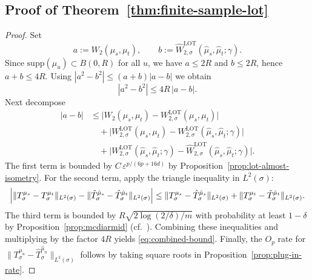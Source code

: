 \documentclass[11pt]{article}
\newcommand{\1}{\mathbf{1}}
\begin{document}
\subsection{Proof of Theorem~\ref{thm:finite-sample-lot}}
\label{app:proof-finite-sample-lot}
\begin{proof}
Set
\[
a:=W_2(\mu_s,\mu_t),\qquad
b:=\widehat{W}_{2,\sigma}^{\mathrm{LOT}}(\hat{\mu}_s,\hat{\mu}_t;\gamma).
\]
Since $\mathrm{supp}(\mu_u)\subset B(0,R)$ for all $u$, we have $a\le 2R$ and
$b\le 2R$, hence $a+b\le 4R$. Using $|a^2-b^2|\le (a+b)|a-b|$ we obtain
\[
|a^2-b^2|\le 4R\,|a-b|.
\]
Next decompose
\begin{align*}
|a-b|
&\le \bigl|W_2(\mu_s,\mu_t) - W_{2,\sigma}^{\mathrm{LOT}}(\mu_s,\mu_t)\bigr|
\\
&\quad + \bigl|W_{2,\sigma}^{\mathrm{LOT}}(\mu_s,\mu_t)
- W_{2,\sigma}^{\mathrm{LOT}}(\hat{\mu}_s,\hat{\mu}_t;\gamma)\bigr|
\\
&\quad + \bigl|W_{2,\sigma}^{\mathrm{LOT}}(\hat{\mu}_s,\hat{\mu}_t;\gamma)
- \widehat{W}_{2,\sigma}^{\mathrm{LOT}}(\hat{\mu}_s,\hat{\mu}_t;\gamma)\bigr|.
\end{align*}
The first term is bounded by $C\,\varepsilon^{p/(6p+16d)}$ by
Proposition~\ref{prop:lot-almost-isometry}.
For the second term, apply the triangle inequality in $L^2(\sigma)$:
\[
\Bigl|\|T_\sigma^{\mu_s}-T_\sigma^{\mu_t}\|_{L^2(\sigma)}
-\|\hat{T}_\sigma^{\hat{\mu}_s}-\hat{T}_\sigma^{\hat{\mu}_t}\|_{L^2(\sigma)}\Bigr|
\le \|T_\sigma^{\mu_s}-\hat{T}_\sigma^{\hat{\mu}_s}\|_{L^2(\sigma)}
+ \|T_\sigma^{\mu_t}-\hat{T}_\sigma^{\hat{\mu}_t}\|_{L^2(\sigma)}.
\]
The third term is bounded by $R\sqrt{2\log(2/\delta)/m}$ with probability at
least $1-\delta$ by Proposition~\ref{prop:mcdiarmid} (cf.\
\cite[Theorem~B.3]{cloninger2023lotwassmap}). Combining these inequalities and
multiplying by the factor $4R$ yields \eqref{eq:combined-bound}. Finally, the
$O_p$ rate for $\|T_\sigma^{\mu_u}-\hat{T}_\sigma^{\hat{\mu}_u}\|_{L^2(\sigma)}$
follows by taking square roots in Proposition~\ref{prop:plug-in-rate}.
\end{proof}
\end{document}
